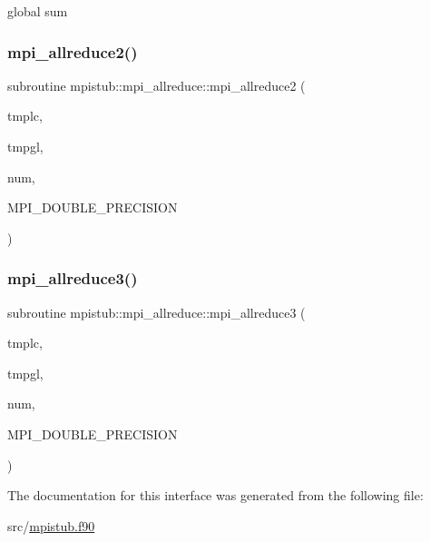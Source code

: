 global sum 

\mbox{\label{interfacempistub_1_1mpi__allreduce_a62ed31b1f8d75b7c750a905470bef81a}} 
\subsubsection{\texorpdfstring{mpi\_allreduce2()}{mpi\_allreduce2()}}
{\footnotesize\ttfamily subroutine mpistub\+::mpi\+\_\+allreduce\+::mpi\+\_\+allreduce2 (\begin{DoxyParamCaption}\item[{double precision}]{tmplc,  }\item[{double precision}]{tmpgl,  }\item[{}]{num,  }\item[{}]{M\+P\+I\+\_\+\+D\+O\+U\+B\+L\+E\+\_\+\+P\+R\+E\+C\+I\+S\+I\+ON }\end{DoxyParamCaption})}

\mbox{\label{interfacempistub_1_1mpi__allreduce_a84ae4c6bc4f8ba767aa88ab96a6a9a81}} 
\subsubsection{\texorpdfstring{mpi\_allreduce3()}{mpi\_allreduce3()}}
{\footnotesize\ttfamily subroutine mpistub\+::mpi\+\_\+allreduce\+::mpi\+\_\+allreduce3 (\begin{DoxyParamCaption}\item[{integer, dimension(\+:)}]{tmplc,  }\item[{integer, dimension(\+:)}]{tmpgl,  }\item[{}]{num,  }\item[{}]{M\+P\+I\+\_\+\+D\+O\+U\+B\+L\+E\+\_\+\+P\+R\+E\+C\+I\+S\+I\+ON }\end{DoxyParamCaption})}



The documentation for this interface was generated from the following file\+:\begin{DoxyCompactItemize}
\item 
src/\mbox{\hyperlink{mpistub_8f90}{mpistub.\+f90}}\end{DoxyCompactItemize}
